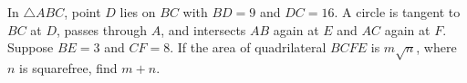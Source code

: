 In \(\triangle ABC\), point \(D\) lies on \(BC\) with \(BD=9\) and \(DC=16\). A circle is tangent to \(BC\) at \(D\), passes through \(A\), and intersects \(AB\) again at \(E\) and \(AC\) again at \(F\). Suppose \(BE=3\) and \(CF=8\). If the area of quadrilateral \(BCFE\) is \(m\sqrt n\), where \(n\) is squarefree, find \(m+n\).
